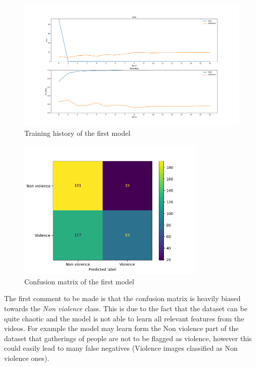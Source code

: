 \begin{figure}[]
    \centering
    \includegraphics[width=1\textwidth]{images/731a-simple3-b538-history.png}
    \caption{Training history of the first model}
    \label{fig:First2DCNNHistory}
\end{figure}

\begin{figure}[]
    \centering
    \includegraphics[width=0.8\textwidth]{images/731a-simple3-b538-conf_matrix.png}
    \caption{Confusion matrix of the first model}
    \label{fig:First2DCNNConfusionMatrix}
\end{figure}

The first comment to be made is that the confusion matrix is heavily biased towards the \textit{Non violence} class. This is due to the fact that the dataset can be quite chaotic and the model is not able to learn all relevant features from the videos. For example the model may learn form the Non violence part of the dataset that gatherings of people are not to be flagged as violence, however this could easily lead to many false negatives (Violence images classified as Non violence ones).

